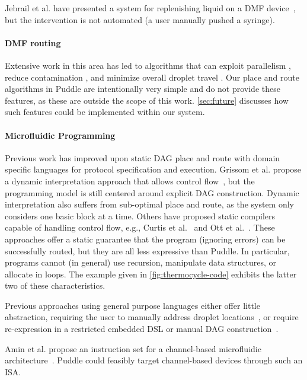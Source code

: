 \documentclass[sigplan, screen]{acmart}
\begin{document}
Jebrail et al. have presented a system for replenishing liquid on a DMF device~\cite{jebrail2015solvent}, but the intervention is not automated (a user manually pushed a syringe).

\paragraph{DMF routing}

Extensive work in this area has led to algorithms that can
exploit parallelism \cite{bohringer2006parallel, grissom2012scheduling},
reduce contamination \cite{yao2016contamination, zhao2012contamination, huang2010contamination},
and minimize overall droplet travel \cite{keszocze2015routing, roy2010routing}.
Our place and route algorithms in Puddle are intentionally very simple and do not provide these features, as these are outside the scope of this work.
\autoref{sec:future} discusses how such features could be implemented within our system.

\paragraph{Microfluidic Programming}
Previous work has improved upon static DAG place and route with domain specific languages for protocol specification and execution.
Grissom et al. propose a dynamic interpretation approach that allows control flow~\cite{grissom2014interpreting}, but the programming model is still centered around explicit DAG construction.
Dynamic interpretation also suffers from sub-optimal place and route, as the system only considers one basic block at a time.
Others have proposed static compilers capable of handling control flow, e.g., Curtis et al.~\cite{curtis2018compiler} and Ott et al.~\cite{ott2018bioscript}.
These approaches offer a static guarantee that the program (ignoring errors) can be successfully routed, but they are all less expressive than Puddle.
In particular, programs cannot (in general) use recursion, manipulate data structures, or allocate in loops.
The example given in \autoref{fig:thermocycle-code} exhibits the latter two of these characteristics.

Previous approaches using general purpose languages either offer little abstraction, requiring the user to manually address droplet locations~\cite{opendrop, dropbot}, or require re-expression in a restricted embedded DSL or manual DAG construction~\cite{curtis2018compiler, biocoder}.

Amin et al. propose an instruction set for a channel-based microfluidic architecture~\cite{amin2007aquacore}.
Puddle could feasibly target channel-based devices through such an ISA.
\end{document}
